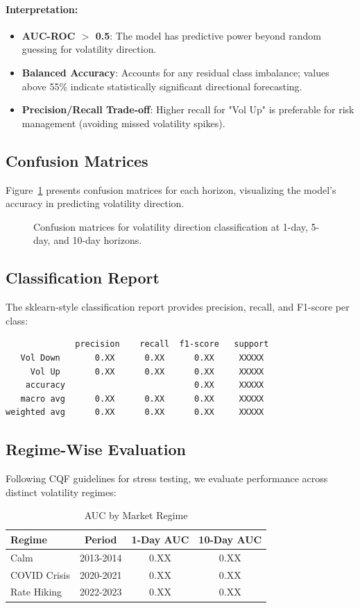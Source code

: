 \documentclass[11pt, a4paper]{article}
\begin{document}
\paragraph{Interpretation:}
\begin{itemize}
    \item \textbf{AUC-ROC $>$ 0.5}: The model has predictive power beyond 
    random guessing for volatility direction.
    \item \textbf{Balanced Accuracy}: Accounts for any residual class imbalance; 
    values above 55\% indicate statistically significant directional forecasting.
    \item \textbf{Precision/Recall Trade-off}: Higher recall for "Vol Up" 
    is preferable for risk management (avoiding missed volatility spikes).
\end{itemize}
\subsection{Confusion Matrices}
Figure~\ref{fig:confusion} presents confusion matrices for each horizon, 
visualizing the model's accuracy in predicting volatility direction.
\begin{figure}[h]
\centering
\caption{Confusion matrices for volatility direction classification at 
1-day, 5-day, and 10-day horizons.}
\label{fig:confusion}
\end{figure}
\subsection{Classification Report}
The sklearn-style classification report provides precision, recall, 
and F1-score per class:
\begin{verbatim}
              precision    recall  f1-score   support
   Vol Down       0.XX      0.XX      0.XX     XXXXX
     Vol Up       0.XX      0.XX      0.XX     XXXXX
    accuracy                          0.XX     XXXXX
   macro avg      0.XX      0.XX      0.XX     XXXXX
weighted avg      0.XX      0.XX      0.XX     XXXXX
\end{verbatim}
\subsection{Regime-Wise Evaluation}
Following CQF guidelines for stress testing, we evaluate performance across 
distinct volatility regimes:
\begin{table}[h]
\centering
\caption{AUC by Market Regime}
\begin{tabular}{lccc}
\toprule
Regime & Period & 1-Day AUC & 10-Day AUC \\
\midrule
Calm          & 2013-2014 & 0.XX & 0.XX \\
COVID Crisis  & 2020-2021 & 0.XX & 0.XX \\
Rate Hiking   & 2022-2023 & 0.XX & 0.XX \\
\bottomrule
\end{tabular}
\label{tab:regime}
\end{table}
\end{document}
